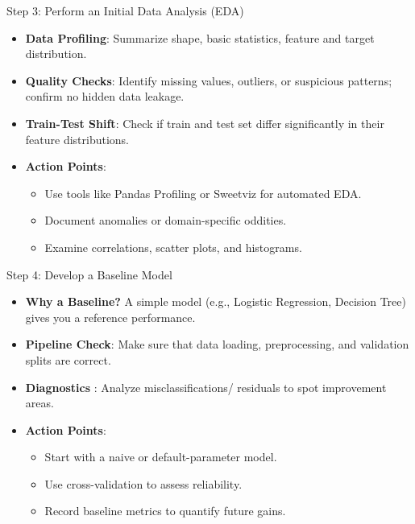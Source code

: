 \documentclass[ignorenonframetext,]{beamer}
\begin{document}
\begin{frame}{Step 3: Perform an Initial Data Analysis (EDA)}
\begin{itemize}
  \item \textbf{Data Profiling}: Summarize shape, basic statistics, feature and target distribution.
  \item \textbf{Quality Checks}: Identify missing values, outliers, or suspicious patterns; confirm no hidden data leakage.
  \item \textbf{Train-Test Shift}: Check if train and test set differ significantly in their feature distributions.
  \item \textbf{Action Points}:
    \begin{itemize}
      \item Use tools like Pandas Profiling or Sweetviz for automated EDA.
      \item Document anomalies or domain-specific oddities.
      \item Examine correlations, scatter plots, and histograms.
    \end{itemize}
\end{itemize}
\end{frame}

\begin{frame}{Step 4: Develop a Baseline Model}
\begin{itemize}
  \item \textbf{Why a Baseline?} A simple model (e.g., Logistic Regression, Decision Tree) gives you a reference performance.
  \item \textbf{Pipeline Check}: Make sure that data loading, preprocessing, and validation splits are correct.
  \item \textbf{Diagnostics} : Analyze misclassifications/ residuals to spot improvement areas.
  \item \textbf{Action Points}:
    \begin{itemize}
      \item Start with a naive or default-parameter model.
      \item Use cross-validation to assess reliability.
      \item Record baseline metrics to quantify future gains.
    \end{itemize}
\end{itemize}
\end{frame}
\end{document}
